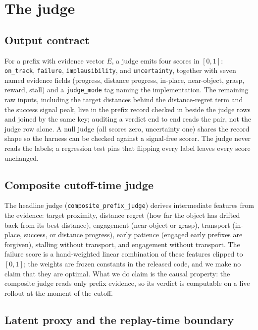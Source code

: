 \documentclass[11pt]{article}
\newcommand{\judgemode}[1]{\texttt{#1}}
\begin{document}
\section{The judge}
\label{sec:judge}

\subsection{Output contract}

For a prefix with evidence vector $E$, a judge emits four scores in $[0,1]$:
\texttt{on\_track}, \texttt{failure}, \texttt{implausibility}, and \texttt{uncertainty},
together with seven named evidence fields (progress, distance progress, in-place,
near-object, grasp, reward, stall) and a \judgemode{judge\_mode} tag naming the
implementation. The remaining raw inputs, including the target distances behind the
distance-regret term and the success signal peak, live in the prefix record checked in
beside the judge rows and joined by the same key; auditing a verdict end to end reads the
pair, not the judge row alone. A null judge (all scores zero,
uncertainty one) shares the record shape so the harness can be checked against a signal-free
scorer. The judge never reads the labels; a regression test pins that flipping every label
leaves every score unchanged.

\subsection{Composite cutoff-time judge}
\label{sec:composite}

The headline judge (\judgemode{composite\_prefix\_judge}) derives intermediate features from
the evidence: target proximity, distance regret (how far the object has drifted back from
its best distance), engagement (near-object or grasp), transport (in-place, success, or
distance progress), early patience (engaged early prefixes are forgiven), stalling without
transport, and engagement without transport. The failure score is a hand-weighted linear
combination of these features clipped to $[0,1]$; the weights are frozen constants in the
released code, and we make no claim that they are optimal. What we do claim is the causal
property: the composite judge reads only prefix evidence, so its verdict is computable on a
live rollout at the moment of the cutoff.

\subsection{Latent proxy and the replay-time boundary}
\label{sec:latent}
\end{document}
